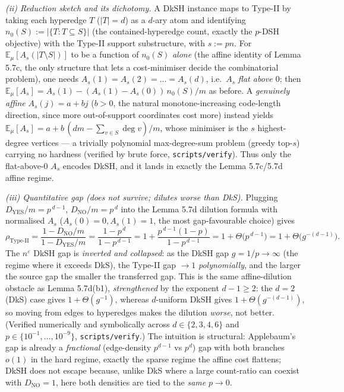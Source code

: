 \documentclass[
]{article}
\begin{document}
\emph{(ii) Reduction sketch and its dichotomy.} A DkSH instance maps to
Type-II by taking each hyperedge $T$ ($|T|=d$) as a $d$-ary atom and
identifying $n_0(S):=|\{T:T\subseteq S\}|$ (the contained-hyperedge
count, exactly the $p$-DSH objective) with the Type-II support
substructure, with $s:=pn$. For $\mathbb E_\mu[A_s(|T\setminus S|)]$ to
be a function of $n_0(S)$ \emph{alone} (the affine identity of
Lemma 5.7c, the only structure that lets a cost-minimiser decide the
combinatorial problem), one needs $A_s(1)=A_s(2)=\dots=A_s(d)$, i.e.\
$A_s$ \emph{flat above $0$}; then
$\mathbb E_\mu[A_s]=A_s(1)-(A_s(1)-A_s(0))\,n_0(S)/m$ as before. A
\emph{genuinely affine} $A_s(j)=a+bj$ ($b>0$, the natural
monotone-increasing code-length direction, since more out-of-support
coordinates cost more) instead yields
$\mathbb E_\mu[A_s]=a+b\,(dm-\sum_{v\in S}\deg v)/m$, whose minimiser is
the $s$ highest-degree vertices --- a trivially polynomial
max-degree-sum problem (greedy top-$s$) carrying no hardness (verified
by brute force, \texttt{scripts/verify}). Thus only the flat-above-$0$
$A_s$ encodes DkSH, and it lands in exactly the Lemma 5.7c/5.7d affine
regime.

\emph{(iii) Quantitative gap (does not survive; dilutes worse than DkS).}
Plugging $D_{\mathrm{YES}}/m=p^{\,d-1}$, $D_{\mathrm{NO}}/m=p^{\,d}$ into
the Lemma 5.7d dilution formula with normalised $A_s$
($A_s(0)=0,A_s(1)=1$, the most gap-favourable choice) gives
\[
\rho_{\mathrm{Type\text{-}II}}
=\frac{1-D_{\mathrm{NO}}/m}{1-D_{\mathrm{YES}}/m}
=\frac{1-p^{\,d}}{1-p^{\,d-1}}
=1+\frac{p^{\,d-1}(1-p)}{1-p^{\,d-1}}
=1+\Theta\!\bigl(p^{\,d-1}\bigr)
=1+\Theta\!\bigl(g^{-(d-1)}\bigr).
\]
The $n^{\varepsilon}$ DkSH gap is \emph{inverted and collapsed}: as the
DkSH gap $g=1/p\to\infty$ (the regime where it exceeds DkS), the Type-II
gap $\to 1$ \emph{polynomially}, and the larger the source gap the
smaller the transferred gap. This is the same affine-dilution obstacle
as Lemma 5.7d(b1), \emph{strengthened} by the exponent $d-1\ge 2$: the
$d=2$ (DkS) case gives $1+\Theta(g^{-1})$, whereas $d$-uniform DkSH gives
$1+\Theta(g^{-(d-1)})$, so moving from edges to hyperedges makes the
dilution \emph{worse}, not better. (Verified numerically and
symbolically across $d\in\{2,3,4,6\}$ and $p\in\{10^{-1},\dots,10^{-9}\}$,
\texttt{scripts/verify}.) The intuition is structural: Applebaum's gap is
already a \emph{fractional} (edge-density $p^{d-1}$ vs $p^{d}$) gap with
both branches $o(1)$ in the hard regime, exactly the sparse regime the
affine cost flattens; DkSH does not escape because, unlike DkS where a
large count-ratio can coexist with $D_{\mathrm{NO}}=1$, here both
densities are tied to the \emph{same} $p\to 0$.
\end{document}
